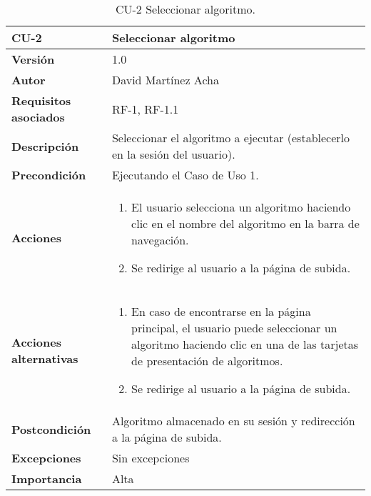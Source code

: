 \begin{table}[p]
	\centering
	\begin{tabularx}{\linewidth}{ p{} p{} }
		\toprule
		\textbf{CU-2}    & \textbf{Seleccionar algoritmo}\\
		\toprule
		\textbf{Versión}              & 1.0    \\
		\textbf{Autor}                & David Martínez Acha \\
		\textbf{Requisitos asociados} & RF-1, RF-1.1 \\
		\textbf{Descripción}          & Seleccionar el algoritmo a ejecutar (establecerlo en la sesión del usuario). \\
		\textbf{Precondición}         & Ejecutando el Caso de Uso 1. \\
		\textbf{Acciones}             &
		\begin{enumerate}
			\def\labelenumi{\arabic{enumi}.}
			\tightlist
			\item El usuario selecciona un algoritmo haciendo clic en el nombre del algoritmo en la barra de navegación.
			\item Se redirige al usuario a la página de subida.
		\end{enumerate}\\
        \textbf{Acciones alternativas}&
		\begin{enumerate}
			\def\labelenumi{\arabic{enumi}.}
			\tightlist
			\item En caso de encontrarse en la página principal, el usuario
		puede seleccionar un algoritmo haciendo clic en una de las tarjetas de
		presentación de algoritmos.
			\item Se redirige al usuario a la página de subida. \end{enumerate}\\
		\textbf{Postcondición}        & Algoritmo almacenado en su sesión y redirección a la página de subida. \\
		\textbf{Excepciones}          & Sin excepciones \\
		\textbf{Importancia}          & Alta \\
		\bottomrule
	\end{tabularx}
	\caption{CU-2 Seleccionar algoritmo.}
\end{table}

